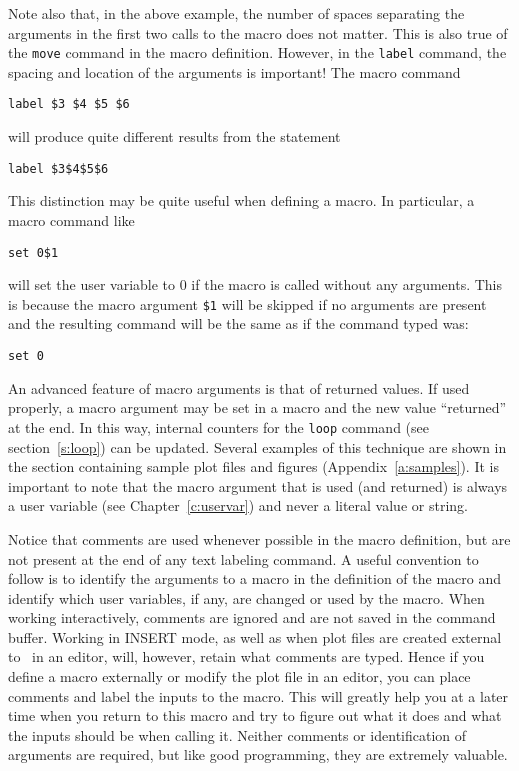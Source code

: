 Note also that, in the above example,
the number of spaces separating the arguments
in the first two calls to the macro does not matter.
This is also true of the {\tt move} command in the macro definition.
However, in the {\tt label} command, the spacing and location of the
arguments is important!
The macro command
\begin{wiplist}%
  \item [\wipd] {\tt label \$3\ \$4\ \$5\ \$6}
\end{wiplist}
will produce quite different results from the statement
\begin{wiplist}%
  \item [\wipd] {\tt label \$3\$4\$5\$6}
\end{wiplist}
This distinction may be quite useful when defining a macro.
In particular, a macro command like
\begin{wiplist}%
  \item [\wipd] {\tt set  0\$1}
\end{wiplist}
will set the user variable  to 0 if the
macro is called without any arguments.
This is because the macro argument {\tt \$1} will be skipped if no arguments
are present and the resulting command will be the same as if the command
typed was:
\begin{wiplist}%
  \item [\wipd] {\tt set  0}
\end{wiplist}

An advanced feature of macro arguments is that of returned values.
If used properly, a macro argument may be set in a macro and the new
value ``returned'' at the end.
In this way, internal counters for the
{\tt loop} command (see section~\ref{s:loop})
can be updated.
Several examples of this technique are shown in the section
containing sample plot files and figures (Appendix~\ref{a:samples}).
It is important to
note that the macro argument that is used (and returned) is always
a user variable (see Chapter~\ref{c:uservar})
and never a literal value or string.

Notice that comments are used whenever possible
in the macro definition,
but are not present at the end of any text labeling command.
A useful convention to follow is to identify the arguments to a macro
in the definition of the macro and identify which
user variables,
if any, are changed or used by the macro.
When working interactively, comments are ignored and are not saved in
the command buffer.
Working in {\rm INSERT} mode,
as well as when plot files are created
external to \wip\ in an editor, will, however, retain what comments are typed.
Hence if you define a macro externally or modify the plot file in an editor,
you can place comments and label the inputs to the macro.
This will greatly help you at a later time when you return to this macro
and try to figure out what it does and what the inputs should be when
calling it.
Neither comments or identification of arguments are required, but like
good programming, they are extremely valuable.


